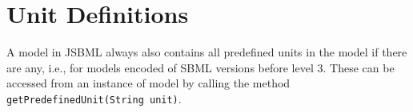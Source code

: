 \documentclass[
  letterpaper,
  12pt,
  headsepline,
  pointlessnumbers,
  tablecaptionabove,
  headinclude,
  appendixprefix,
  idxtotoc,
  bibtotoc
]{scrartcl}
\begin{document}
\section{Unit Definitions}

A model in JSBML always also contains all predefined units in the model
if there are any, i.e., for models encoded of SBML versions before level
3. These can be accessed from an instance of model by calling the method
\verb!getPredefinedUnit(String unit)!.


% 
% 
\end{document}
